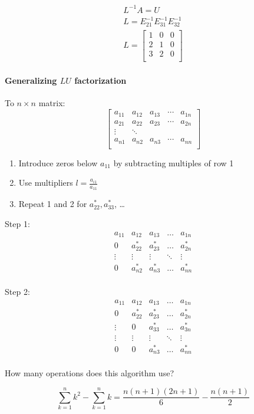\[
  \begin{matrix}
    L^{-1}A = U \\
    L = E_{21}^{-1} E_{31}^{-1} E_{32}^{-1} \\
    L = \begin{bmatrix}
      1 & 0 & 0 \\
      2 & 1 & 0 \\
      3 & 2 & 0 \\
    \end{bmatrix}
  \end{matrix}
\]

\paragraph{Generalizing $LU$ factorization} To $n \times n$ matrix:
\[
  \begin{bmatrix}
    a_{11} & a_{12} & a_{13} & \cdots &  a_{1n} \\
    a_{21} & a_{22} & a_{23} & \cdots &  a_{2n} \\
    \vdots & \ddots &  &  &   \\
    a_{n1} & a_{n2} & a_{n3} & \cdots &  a_{nn} \\
  \end{bmatrix}
\]

\begin{enumerate}
  \item Introduce zeros below $a_{11}$ by subtracting multiples of row 1
  \item Use multipliers $l = \frac{a_{i1}}{a_{11}}$
  \item Repeat 1 and 2 for $a_{22}^*,a_{33}^*$, \dots
\end{enumerate}

Step 1:
\[
  \begin{array}{c|cccc}
    a_{11} & a_{12} & a_{13} & \dots &  a_{1n} \\\hline
    0 & a_{22}^* & a_{23}^* & \dots &  a_{2n}^* \\
    \vdots & \vdots & \vdots & \ddots & \vdots  \\
    0 & a_{n2}^* & a_{n3}^* & \dots &  a_{nn}^* \\
  \end{array}
\]

Step 2:
\[
  \begin{array}{c|c|ccc}
    a_{11} & a_{12} & a_{13} & \dots &  a_{1n} \\\hline
    0 & a_{22}^* & a_{23}^* & \dots &  a_{2n}^* \\\hline
    \vdots & 0 & a_{33}^* & \dots & a_{3n}^* \\
    \vdots & \vdots & \vdots & \ddots & \vdots  \\
    0 & 0 & a_{n3}^* & \dots &  a_{nn}^* \\
  \end{array}
\]

How many operations does this algorithm use?

\[
  \sum_{k=1}^n k^2 - \sum_{k=1}^n k = \frac{n(n+1)(2n+1)}{6} - \frac{n(n+1)}{2}
\]